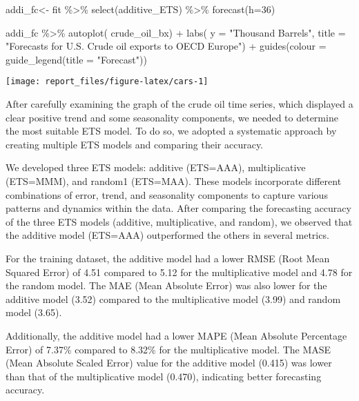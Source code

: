 \documentclass[
]{article}
\newenvironment{Shaded}{\begin{snugshade}}{\end{snugshade}}
\newcommand{\AttributeTok}[1]{\textcolor[rgb]{0.77,0.63,0.00}{#1}}
\newcommand{\DecValTok}[1]{\textcolor[rgb]{0.00,0.00,0.81}{#1}}
\newcommand{\FunctionTok}[1]{\textcolor[rgb]{0.00,0.00,0.00}{#1}}
\newcommand{\NormalTok}[1]{#1}
\newcommand{\OtherTok}[1]{\textcolor[rgb]{0.56,0.35,0.01}{#1}}
\newcommand{\SpecialCharTok}[1]{\textcolor[rgb]{0.00,0.00,0.00}{#1}}
\newcommand{\StringTok}[1]{\textcolor[rgb]{0.31,0.60,0.02}{#1}}
\begin{document}
\begin{Shaded}
\begin{Highlighting}[]
\NormalTok{addi\_fc}\OtherTok{\textless{}{-}}\NormalTok{ fit }\SpecialCharTok{\%\textgreater{}\%} \FunctionTok{select}\NormalTok{(additive\_ETS) }\SpecialCharTok{\%\textgreater{}\%} \FunctionTok{forecast}\NormalTok{(}\AttributeTok{h=}\DecValTok{36}\NormalTok{)}

\NormalTok{addi\_fc }\SpecialCharTok{\%\textgreater{}\%} 
  \FunctionTok{autoplot}\NormalTok{(}
\NormalTok{    crude\_oil\_bx) }\SpecialCharTok{+}
  \FunctionTok{labs}\NormalTok{(}
    \AttributeTok{y =} \StringTok{"Thousand Barrels"}\NormalTok{,}
    \AttributeTok{title =} \StringTok{"Forecasts for U.S. Crude oil exports to OECD Europe"}\NormalTok{) }\SpecialCharTok{+}
  \FunctionTok{guides}\NormalTok{(}\AttributeTok{colour =} \FunctionTok{guide\_legend}\NormalTok{(}\AttributeTok{title =} \StringTok{"Forecast"}\NormalTok{))}
\end{Highlighting}
\end{Shaded}

\begin{center}\texttt{[image: report\_files/figure-latex/cars-1]} \end{center}

After carefully examining the graph of the crude oil time series, which
displayed a clear positive trend and some seasonality components, we
needed to determine the most suitable ETS model. To do so, we adopted a
systematic approach by creating multiple ETS models and comparing their
accuracy.

We developed three ETS models: additive (ETS=AAA), multiplicative
(ETS=MMM), and random1 (ETS=MAA). These models incorporate different
combinations of error, trend, and seasonality components to capture
various patterns and dynamics within the data. After comparing the
forecasting accuracy of the three ETS models (additive, multiplicative,
and random), we observed that the additive model (ETS=AAA) outperformed
the others in several metrics.

For the training dataset, the additive model had a lower RMSE (Root Mean
Squared Error) of 4.51 compared to 5.12 for the multiplicative model and
4.78 for the random model. The MAE (Mean Absolute Error) was also lower
for the additive model (3.52) compared to the multiplicative model
(3.99) and random model (3.65).

Additionally, the additive model had a lower MAPE (Mean Absolute
Percentage Error) of 7.37\% compared to 8.32\% for the multiplicative
model. The MASE (Mean Absolute Scaled Error) value for the additive
model (0.415) was lower than that of the multiplicative model (0.470),
indicating better forecasting accuracy.
\end{document}

